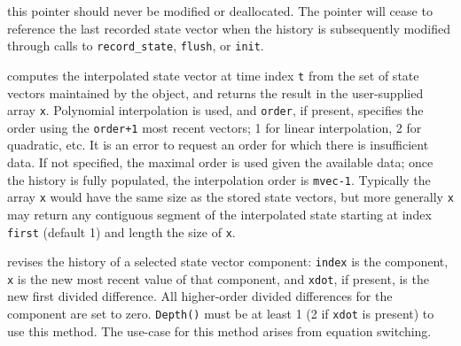 \documentclass[11pt]{article}
\begin{document}
\begin{description}[style=nextline]
  this pointer should never be modified or deallocated.  The pointer will
  cease to reference the last recorded state vector when the history is
  subsequently modified through calls to \texttt{record_state}, \texttt{flush},
  or \texttt{init}.
\item[\texttt{interp_state(t, x \Lbr,first\Rbr \Lbr,order\Rbr)}]
  computes the interpolated state vector at time index \texttt{t} from the
  set of state vectors maintained by the object, and returns the result in
  the user-supplied array \texttt{x}.  Polynomial interpolation is used, and
  \texttt{order}, if present, specifies the order using the \texttt{order+1}
  most recent vectors; 1 for linear interpolation, 2 for quadratic, etc.
  It is an error to request an order for which there is insufficient data.
  If not specified, the maximal order is used given the available data; once
  the history is fully populated, the interpolation order is \texttt{mvec-1}.
  Typically the array \texttt{x} would have the same size as the stored state
  vectors, but more generally \texttt{x} may return any contiguous segment of
  the interpolated state starting at index \texttt{first} (default 1) and
  length the size of \texttt{x}.
\item[\texttt{revise(index, x \Lbr,xdot\Rbr)}]
  revises the history of a selected state vector component: \texttt{index}
  is the component, \texttt{x} is the new most recent value of that component,
  and \texttt{xdot}, if present, is the new first divided difference.
  All higher-order divided differences for the component are set to zero.
  \texttt{Depth()} must be at least 1 (2 if \texttt{xdot} is present) to use
  this method.  The use-case for this method arises from equation switching.
\end{description}
\end{document}
